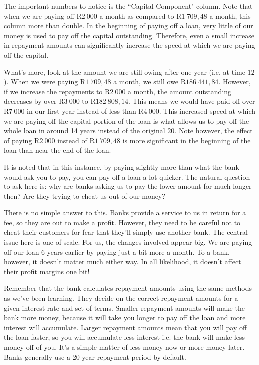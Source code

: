 The important numbers to notice is the ``Capital Component" column. Note that when we are paying off R$2~000$ a month as compared to R$1~709,48$ a month, this column more than double. In the beginning of paying off a loan, very little of our money is used to pay off the capital outstanding. Therefore, even a small increase in repayment amounts can significantly increase the speed at which we are paying off the capital.

What's more, look at the amount we are still owing after one year (i.e. at time $12$). When we were paying R$1~709,48$ a month, we still owe R$186~441,84$. However, if we increase the repayments to R$2~000$ a month, the amount outstanding decreases by over R$3~000$ to R$182~808,14$. This means we would have paid off over R$7~000$ in our first year instead of less than R$4~000$. This increased speed at which we are paying off the capital portion of the loan is what allows us to pay off the whole loan in around 14 years instead of the original $20$. Note however, the effect of paying R$2~000$ instead of R$1~709,48$ is more significant in the beginning of the loan than near the end of the loan.

It is noted that in this instance, by paying slightly more than what the bank would ask you to pay, you can pay off a loan a lot quicker. The natural question to ask here is: why are banks asking us to pay the lower amount for much longer then? Are they trying to cheat us out of our money?

There is no simple answer to this. Banks provide a service to us in return for a fee, so they are out to make a profit. However, they need to be careful not to cheat their customers for fear that they'll simply use another bank. The central issue here is one of scale. For us, the changes involved appear big. We are paying off our loan 6 years earlier by paying just a bit more a month. To a bank, however, it doesn't matter much either way. In all likelihood, it doesn't affect their profit margins one bit!

Remember that the bank calculates repayment amounts using the same methods as we've been learning. They decide on the correct repayment amounts for a given interest rate and set of terms. Smaller repayment amounts will make the bank more money, because it will take you longer to pay off the loan and more interest will accumulate. Larger repayment amounts mean that you will pay off the loan faster, so you will accumulate less interest i.e. the bank will make less money off of you. It's a simple matter of less money now or more money later. Banks generally use a 20 year repayment period by default.


